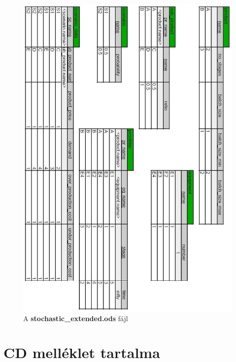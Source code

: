 \begin{figure}[H]
\begin{center}
\includegraphics[scale=0.65]{stochasticExtendedOds}
\caption{A \textbf{stochastic\_extended.ods} fájl}
\label{stochastic_ods}
\end{center}
\end{figure}
\chapter{CD melléklet tartalma}